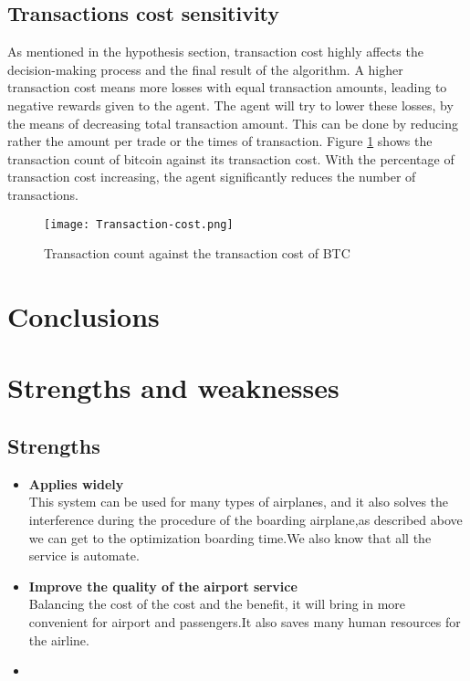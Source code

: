 \documentclass{mcmthesis}
\begin{document}
\subsection{Transactions cost sensitivity}

As mentioned in the hypothesis section, transaction cost highly affects the decision-making process and the final result of the algorithm.
A higher transaction cost means more losses with equal transaction amounts,
leading to negative rewards given to the agent.
The agent will try to lower these losses, by the means of decreasing total transaction amount.
This can be done by reducing rather the amount per trade or the times of transaction.
Figure \ref{Transaction-cost} shows the transaction count of bitcoin against its transaction cost.
With the percentage of transaction cost increasing, the agent significantly reduces the number of transactions.

\begin{figure}[h]
  \small
  \centering
  \texttt{[image: Transaction-cost.png]}
  \caption{Transaction count against the transaction cost of BTC}
  \label{Transaction-cost}
\end{figure}

\section{Conclusions}
\lipsum[6]

\section{Strengths and weaknesses}
\lipsum[12]

\subsection{Strengths}
\begin{itemize}
\item \textbf{Applies widely}\\
This  system can be used for many types of airplanes, and it also
solves the interference during  the procedure of the boarding
airplane,as described above we can get to the  optimization
boarding time.We also know that all the service is automate.
\item \textbf{Improve the quality of the airport service}\\
Balancing the cost of the cost and the benefit, it will bring in
more convenient  for airport and passengers.It also saves many
human resources for the airline. \item \textbf{}
\end{itemize}
\end{document}
